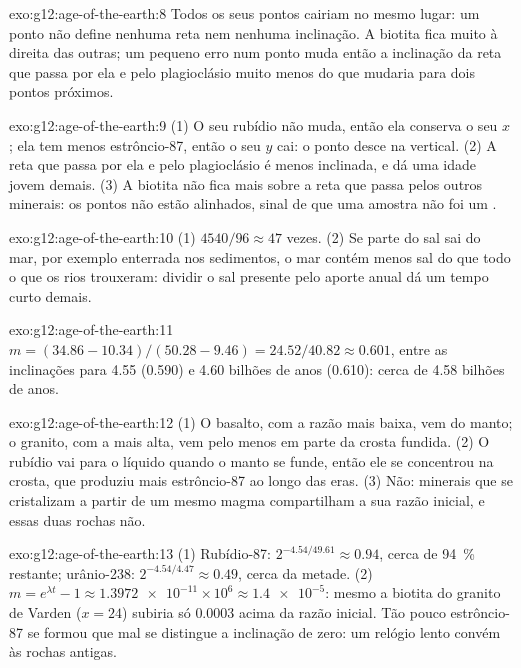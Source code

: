\begin{solution}{exo:g12:age-of-the-earth:8}
Todos os seus pontos cairiam no mesmo lugar: um ponto não define nenhuma reta
nem nenhuma inclinação. A biotita fica muito à direita das outras; um pequeno
erro num ponto muda então a inclinação da reta que passa por ela e pelo
plagioclásio muito menos do que mudaria para dois pontos próximos.
\end{solution}

\begin{solution}{exo:g12:age-of-the-earth:9}
(1) O seu rubídio não muda, então ela conserva o seu $x$; ela tem menos
estrôncio-87, então o seu $y$ cai: o ponto desce na vertical. (2) A reta que
passa por ela e pelo plagioclásio é menos inclinada, e dá uma idade jovem
demais. (3) A biotita não fica mais sobre a reta que passa pelos outros
minerais: os pontos não estão alinhados, sinal de que uma amostra não foi um
.
\end{solution}

\begin{solution}{exo:g12:age-of-the-earth:10}
(1) $4540/96 \approx 47$ vezes. (2) Se parte do sal sai do mar, por exemplo
enterrada nos sedimentos, o mar contém menos sal do que todo o que os rios
trouxeram: dividir o sal presente pelo aporte anual dá um tempo curto
demais.
\end{solution}

\begin{solution}{exo:g12:age-of-the-earth:11}
$m = (34.86 - 10.34)/(50.28 - 9.46) = 24.52/40.82 \approx 0.601$, entre
as inclinações para 4.55 (0.590) e 4.60 bilhões de anos (0.610): cerca de
4.58 bilhões de anos.
\end{solution}

\begin{solution}{exo:g12:age-of-the-earth:12}
(1) O basalto, com a razão mais baixa, vem do manto; o granito, com a mais
alta, vem pelo menos em parte da crosta fundida. (2) O rubídio vai para o
líquido quando o manto se funde, então ele se concentrou na crosta, que
produziu mais estrôncio-87 ao longo das eras. (3) Não: minerais que se
cristalizam a partir de um mesmo magma compartilham a sua razão inicial, e
essas duas rochas não.
\end{solution}

\begin{solution}{exo:g12:age-of-the-earth:13}
(1) Rubídio-87: $2^{-4.54/49.61} \approx 0.94$, cerca de \qty{94}{\percent}
restante; urânio-238: $2^{-4.54/4.47} \approx 0.49$, cerca da metade. (2) $m =
e^{\lambda t} - 1 \approx \num{1.3972e-11} \times 10^6 \approx
\num{1.4e-5}$: mesmo a biotita do granito de Varden ($x = 24$) subiria
só $0.0003$ acima da razão inicial. Tão pouco estrôncio-87 se formou que mal
se distingue a inclinação de zero: um relógio lento convém às rochas antigas.
\end{solution}

